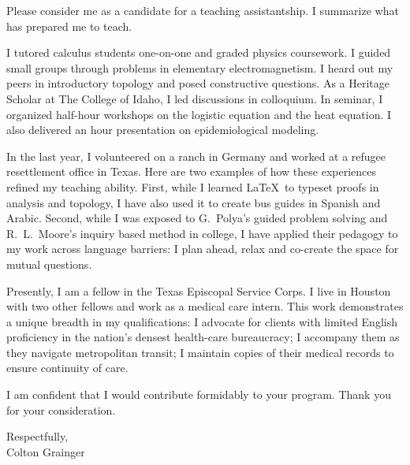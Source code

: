 \documentclass[10pt]{letter}
\newcommand{\term}[1]{\textmd{#1}}
\begin{document}
\begin{letter}{
}
Please consider me as a candidate for a teaching assistantship. I summarize what has prepared me to teach. 
\begin{description}[topsep=0pt]
	\item[Tutoring \& Grading] I \term{tutored calculus students} one-on-one and \term{graded physics coursework}. I guided small groups through problems in elementary electromagnetism. I heard out my peers in introductory topology and posed constructive questions. As a Heritage Scholar at The College of Idaho, I led discussions in colloquium. In seminar, I organized half-hour workshops on the logistic equation and the heat equation. I also delivered an hour presentation on \term{epidemiological modeling}. 
	\item[Time Away from School] In the last year, I volunteered on a ranch in Germany and worked at a refugee resettlement office in Texas. Here are two examples of how these experiences refined my teaching ability. First, while I learned \LaTeX\ to typeset proofs in analysis and topology, I have also used it to create bus guides in Spanish and Arabic. Second, while I was exposed to G.~Polya's guided problem solving and R.~L.~Moore's inquiry based method in college, I have applied their pedagogy to my work across language barriers: I plan ahead, relax and co-create the space for mutual questions.
\end{description}

Presently, I am a fellow in the Texas Episcopal Service Corps. I live in Houston with two other fellows and work as a medical care intern. This work demonstrates a unique breadth in my qualifications: I advocate for clients with limited English proficiency in the nation's densest health-care bureaucracy; I accompany them as they navigate metropolitan transit; I maintain copies of their medical records to ensure continuity of care.

I am confident that I would contribute formidably to your program. Thank you for your consideration.

\closing{Respectfully,\\Colton Grainger}
\end{letter}
\end{document}
